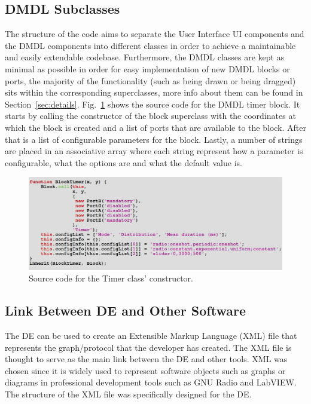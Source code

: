 \documentclass[journal,comsoc]{IEEEtran}
\begin{document}
\subsection{DMDL Subclasses}
The structure of the code aims to separate the User Interface UI components and the DMDL components
into different classes in order to achieve a maintainable and easily extendable codebase.
Furthermore, the DMDL classes are kept as minimal as possible in order for easy implementation
of new DMDL blocks or ports, the majority of the functionality (such as being drawn or being
dragged) sits within the corresponding superclasses, more info about them can be found in
Section~\ref{sec:details}. Fig.~\ref{fig:timer_src} shows the source code for the DMDL timer block.
It starts by calling the constructor of the block superclass with the coordinates at which the
block is created and a list of ports that are available to the block. After that is a list of 
configurable parameters for the block. Lastly, a number of strings are placed in an associative
array where each string represent how a parameter is configurable, what the options are and what
the default value is.
\begin{figure}[!t]
\centering
    \includegraphics[width=\columnwidth]{timer_src.png}
    \caption{Source code for the Timer class' constructor.}
    \label{fig:timer_src}
\end{figure}

\subsection{Link Between DE and Other Software}
The DE can be used to create an Extensible Markup Language (XML) file that represents the
graph/protocol that the developer has created. The XML file is thought to serve as the main link
between the DE and other tools. XML was chosen since it is widely used to represent software
objects such as graphs or diagrams in professional development tools such as GNU Radio and
LabVIEW. The structure of the XML file was specifically designed for the DE.
\end{document}
